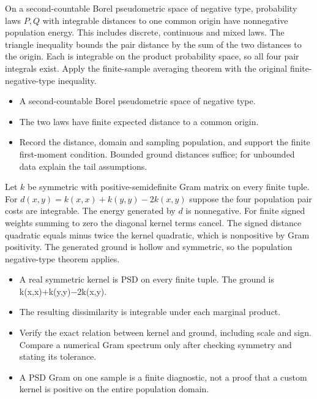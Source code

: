 \expandafter\def\csname statadic@statement@STATADIC-ENERGY-007\endcsname{On a second-countable Borel pseudometric space of negative type,
  probability laws $P,Q$ with integrable distances to one common origin have nonnegative
  population energy. This includes discrete, continuous and mixed laws.}
\expandafter\def\csname statadic@proof@STATADIC-ENERGY-007\endcsname{The triangle inequality bounds the pair distance by the sum of the
  two distances to the origin. Each is integrable on the product probability
  space, so all four pair integrals exist. Apply the finite-sample averaging
  theorem with the original finite-negative-type inequality.}
\expandafter\def\csname statadic@assumptions@STATADIC-ENERGY-007\endcsname{\begin{itemize}
\item A second-countable Borel pseudometric space of negative type.
\item The two laws have finite expected distance to a common origin.
\end{itemize}}
\expandafter\def\csname statadic@diagnostics@STATADIC-ENERGY-007\endcsname{\begin{itemize}
\item Record the distance, domain and sampling population, and support the finite first-moment condition. Bounded ground distances suffice; for unbounded data explain the tail assumptions.
\end{itemize}}
\expandafter\def\csname statadic@statement@STATADIC-ENERGY-008\endcsname{Let $k$ be symmetric with positive-semidefinite Gram matrix
  on every finite tuple. For $d(x,y)=k(x,x)+k(y,y)-2k(x,y)$ suppose the
  four population pair costs are integrable. The energy generated by $d$ is nonnegative.}
\expandafter\def\csname statadic@proof@STATADIC-ENERGY-008\endcsname{For finite signed weights summing to zero the diagonal
  kernel terms cancel. The signed distance quadratic equals minus twice
  the kernel quadratic, which is nonpositive by Gram positivity.
  The generated ground is hollow and symmetric, so the population
  negative-type theorem applies.}
\expandafter\def\csname statadic@assumptions@STATADIC-ENERGY-008\endcsname{\begin{itemize}
\item A real symmetric kernel is PSD on every finite tuple. The ground is k(x,x)+k(y,y)\ensuremath{-}2k(x,y).
\item The resulting dissimilarity is integrable under each marginal product.
\end{itemize}}
\expandafter\def\csname statadic@diagnostics@STATADIC-ENERGY-008\endcsname{\begin{itemize}
\item Verify the exact relation between kernel and ground, including scale and sign. Compare a numerical Gram spectrum only after checking symmetry and stating its tolerance.
\item A PSD Gram on one sample is a finite diagnostic, not a proof that a custom kernel is positive on the entire population domain.
\end{itemize}}
